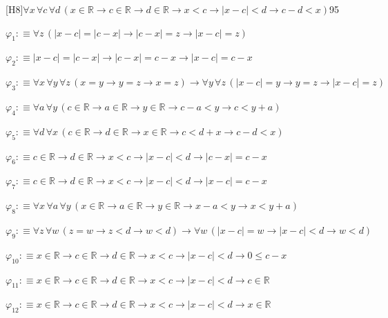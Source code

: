 \begin{fullproof}{[H8]}{$\forall x\,\forall c\,\forall d\,(x \in \mathbb{R} \to c \in \mathbb{R} \to d \in \mathbb{R} \to x < c \to \lvert x - c \rvert < d \to c - d < x)$}{95}
\begin{ptree}
\noLine
{}
\end{ptree}
\begin{abbrevlist}
\item $\varphi_{1} :\equiv \forall z\,(\lvert x - c \rvert = \lvert c - x \rvert \to \lvert c - x \rvert = z \to \lvert x - c \rvert = z)$
\item $\varphi_{2} :\equiv \lvert x - c \rvert = \lvert c - x \rvert \to \lvert c - x \rvert = c - x \to \lvert x - c \rvert = c - x$
\item $\varphi_{3} :\equiv \forall x\,\forall y\,\forall z\,(x = y \to y = z \to x = z) \to \forall y\,\forall z\,(\lvert x - c \rvert = y \to y = z \to \lvert x - c \rvert = z)$
\item $\varphi_{4} :\equiv \forall a\,\forall y\,(c \in \mathbb{R} \to a \in \mathbb{R} \to y \in \mathbb{R} \to c - a < y \to c < y + a)$
\item $\varphi_{5} :\equiv \forall d\,\forall x\,(c \in \mathbb{R} \to d \in \mathbb{R} \to x \in \mathbb{R} \to c < d + x \to c - d < x)$
\item $\varphi_{6} :\equiv c \in \mathbb{R} \to d \in \mathbb{R} \to x < c \to \lvert x - c \rvert < d \to \lvert c - x \rvert = c - x$
\item $\varphi_{7} :\equiv c \in \mathbb{R} \to d \in \mathbb{R} \to x < c \to \lvert x - c \rvert < d \to \lvert x - c \rvert = c - x$
\item $\varphi_{8} :\equiv \forall x\,\forall a\,\forall y\,(x \in \mathbb{R} \to a \in \mathbb{R} \to y \in \mathbb{R} \to x - a < y \to x < y + a)$
\item $\varphi_{9} :\equiv \forall z\,\forall w\,(z = w \to z < d \to w < d) \to \forall w\,(\lvert x - c \rvert = w \to \lvert x - c \rvert < d \to w < d)$
\item $\varphi_{10} :\equiv x \in \mathbb{R} \to c \in \mathbb{R} \to d \in \mathbb{R} \to x < c \to \lvert x - c \rvert < d \to 0 \leq c - x$
\item $\varphi_{11} :\equiv x \in \mathbb{R} \to c \in \mathbb{R} \to d \in \mathbb{R} \to x < c \to \lvert x - c \rvert < d \to c \in \mathbb{R}$
\item $\varphi_{12} :\equiv x \in \mathbb{R} \to c \in \mathbb{R} \to d \in \mathbb{R} \to x < c \to \lvert x - c \rvert < d \to x \in \mathbb{R}$

\end{abbrevlist}
\end{fullproof}
